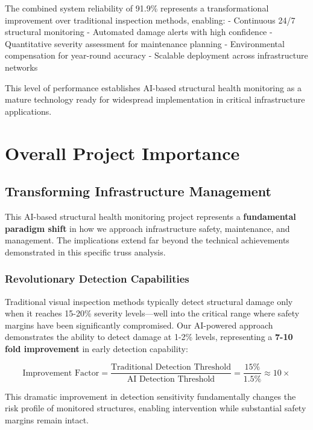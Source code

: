 \documentclass[11pt,a4paper]{article}
\begin{document}
The combined system reliability of 91.9\% represents a transformational improvement over traditional inspection methods, enabling:
- Continuous 24/7 structural monitoring
- Automated damage alerts with high confidence
- Quantitative severity assessment for maintenance planning
- Environmental compensation for year-round accuracy
- Scalable deployment across infrastructure networks

This level of performance establishes AI-based structural health monitoring as a mature technology ready for widespread implementation in critical infrastructure applications.

\section{Overall Project Importance}

\subsection{Transforming Infrastructure Management}

This AI-based structural health monitoring project represents a \textbf{fundamental paradigm shift} in how we approach infrastructure safety, maintenance, and management. The implications extend far beyond the technical achievements demonstrated in this specific truss analysis.

\subsubsection{Revolutionary Detection Capabilities}

Traditional visual inspection methods typically detect structural damage only when it reaches 15-20\% severity levels—well into the critical range where safety margins have been significantly compromised. Our AI-powered approach demonstrates the ability to detect damage at 1-2\% levels, representing a \textbf{7-10 fold improvement} in early detection capability:

\begin{equation}
\text{Improvement Factor} = \frac{\text{Traditional Detection Threshold}}{\text{AI Detection Threshold}} = \frac{15\%}{1.5\%} \approx 10\times
\end{equation}

This dramatic improvement in detection sensitivity fundamentally changes the risk profile of monitored structures, enabling intervention while substantial safety margins remain intact.
\end{document}
